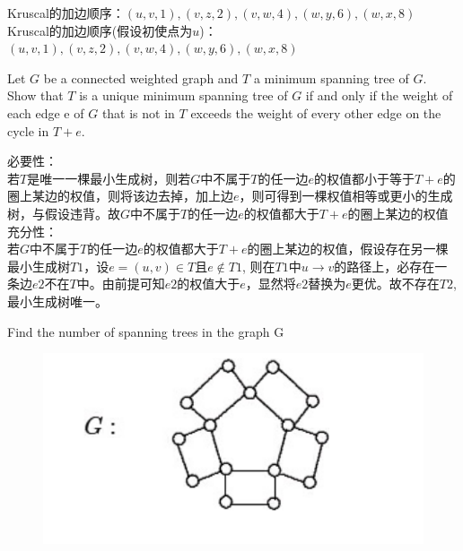 \documentclass[a4paper, justified]{tufte-handout}
\begin{document}
\begin{solution}
  Kruscal的加边顺序：$(u,v,1),(v,z,2),(v,w,4),(w,y,6),(w,x,8)$\\
  Kruscal的加边顺序(假设初使点为$u$)：$(u,v,1),(v,z,2),(v,w,4),(w,y,6),(w,x,8)$\\
\end{solution}

\begin{problem}[CZ 4.30]
Let $G$ be a connected weighted graph and $T$ a minimum spanning tree of $G$. Show that $T$ is a unique minimum spanning tree of $G$ if and only if the weight of each edge e of $G$ that is not in $T$ exceeds the weight of every other edge on the cycle in $T + e$.
\end{problem}

\begin{solution}
  必要性：\\
  若$T$是唯一一棵最小生成树，则若$G$中不属于$T$的任一边$e$的权值都小于等于$T+e$的圈上某边的权值，则将该边去掉，加上边$e$，则可得到一棵权值相等或更小的生成树，与假设违背。故$G$中不属于$T$的任一边$e$的权值都大于$T+e$的圈上某边的权值\\
  充分性：\\
  若$G$中不属于$T$的任一边$e$的权值都大于$T+e$的圈上某边的权值，假设存在另一棵最小生成树$T1$，设$e=(u,v)\in T$且$e \notin T1$, 则在$T1$中$u\to v$的路径上，必存在一条边$e2$不在$T$中。由前提可知$e2$的权值大于$e$，显然将$e2$替换为$e$更优。故不存在$T2$,最小生成树唯一。
\end{solution}

\begin{problem}[CZ 4.36]
Find the number of spanning trees in the graph G\\
\begin{figure}[htbp]
  \centering
  \includegraphics[width = 0.70\linewidth]{figs/aa}
\end{figure}
\end{problem}
\end{document}
